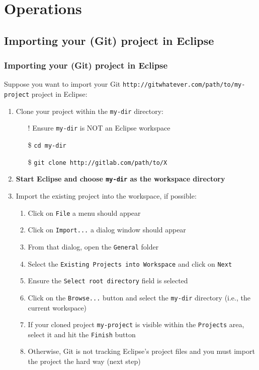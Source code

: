 \documentclass[handout]{beamer}\mode<presentation>{\usetheme{AMSCesenaBleu}}
\begin{document}
\section{Operations}

\subsection{Importing your (Git) project in Eclipse}

\begin{frame}[allowframebreaks]
\frametitle{Importing your (Git) project in Eclipse} 
    Suppose you want to import your Git \texttt{http://gitwhatever.com/path/to/\alert{my-project}} project in Eclipse:
    \begin{enumerate}
        \item Clone your project within the \texttt{\alert{my-dir}} directory:
        \begin{itemize}
            \item[!] Ensure \texttt{my-dir} is NOT an Eclipse workspace
            \item[\$] \texttt{cd \alert{my-dir}}
            \item[\$] \texttt{git clone http://gitlab.com/path/to/X} 
        \end{itemize}
        
        \item \textbf{Start Eclipse and choose \texttt{\alert{my-dir}} as the workspace directory}
        
        \item Import the existing project into the workspace, if possible:
        \begin{enumerate}
            \item Click on \texttt{File} a menu should appear
            \item Click on \texttt{Import...} a dialog window should appear
            \item From that dialog, open the \texttt{General} folder
            \item Select the \texttt{Existing Projects into Workspace} and click on \texttt{Next}
            \item Ensure the \texttt{Select root directory} field is selected
            \item Click on the \texttt{Browse...} button and select the \texttt{\alert{my-dir}} directory (i.e.,  the current workspace)
            \item If your cloned project \texttt{\alert{my-project}} is visible within the \texttt{Projects} area, select it and hit the \texttt{Finish} button
            \item Otherwise, Git is not tracking Eclipse's project files and you must import the project the hard way (next step)
        \end{enumerate}
        

\end{enumerate}
\end{frame}
\end{document}
